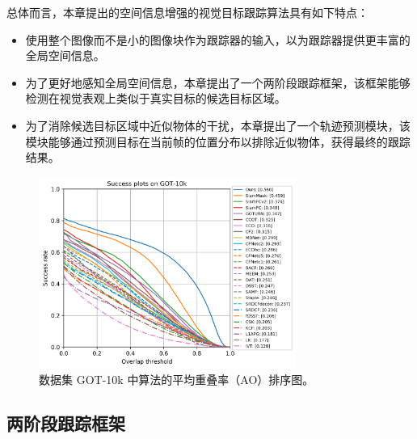 总体而言，本章提出的空间信息增强的视觉目标跟踪算法具有如下特点：
\begin{itemize}
\item 使用整个图像而不是小的图像块作为跟踪器的输入，以为跟踪器提供更丰富的全局空间信息。
\item 为了更好地感知全局空间信息，本章提出了一个两阶段跟踪框架，该框架能够检测在视觉表观上类似于真实目标的候选目标区域。
\item 为了消除候选目标区域中近似物体的干扰，本章提出了一个轨迹预测模块，该模块能够通过预测目标在当前帧的位置分布以排除近似物体，获得最终的跟踪结果。
\end{itemize}

\begin{figure}[t]
\centering
    \includegraphics[width=0.75\textwidth]{Img/globally/success_plot.png}
    \caption{数据集 GOT-10k \cite{GOT-10k} 中算法的平均重叠率（AO）排序图。}
    \label{fig:globally_got10k}
\end{figure}

\subsection{两阶段跟踪框架}

